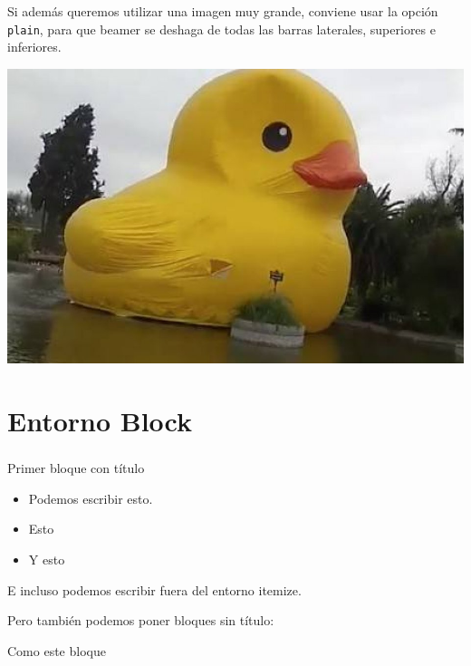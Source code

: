 \documentclass[11pt]{beamer}	%
\begin{document}
\begin{frame}
	\frametitle{\secname}	%
	
	Si además queremos utilizar una imagen muy grande, conviene usar la opción \texttt{plain}, para que beamer se deshaga de todas las barras laterales, superiores e inferiores.
\end{frame}

\begin{frame}[plain]
	\begin{center}
		\includegraphics[scale=0.35]{pobrepatito.jpg}
	\end{center}
\end{frame}

\section{Entorno Block}
\begin{frame}
	\frametitle{\secname}
	
	\begin{block}{Primer bloque con título}	%
	\begin{itemize}
		\item Podemos escribir esto.
		\item Esto
		\item Y esto 
	\end{itemize}
	
	E incluso podemos escribir \alert{fuera del entorno itemize}.	%
	\end{block}
	
	Pero también podemos poner bloques sin título:
	
	\begin{block}{}
		Como este bloque
	\end{block}
\end{frame}
\end{document}
